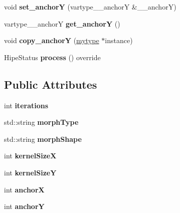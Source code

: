 \begin{DoxyCompactItemize}
void {\bfseries set\+\_\+anchorY} (vartype\+\_\+\+\_\+anchorY \&\+\_\+\+\_\+anchorY)
\item 
\mbox{\label{classfilter_1_1algos_1_1_erode_a42a3c13177f3756c07291c1bae19f8a4}} 
vartype\+\_\+\+\_\+anchorY {\bfseries get\+\_\+anchorY} ()
\item 
\mbox{\label{classfilter_1_1algos_1_1_erode_a3650b5064832039e85049883df7ac4a9}} 
void {\bfseries copy\+\_\+anchorY} (\hyperlink{classfilter_1_1algos_1_1_erode}{mytype} $\ast$instance)
\item 
\mbox{\label{classfilter_1_1algos_1_1_erode_a3307e2b455b2dd757bb8afa08e1c5df3}} 
Hipe\+Status {\bfseries process} () override
\end{DoxyCompactItemize}
\subsection*{Public Attributes}
\begin{DoxyCompactItemize}
\item 
\mbox{\label{classfilter_1_1algos_1_1_erode_add7d75df990a81e384dc121aee66a1db}} 
int {\bfseries iterations}
\item 
\mbox{\label{classfilter_1_1algos_1_1_erode_a4ce0ba3028d392dc896150f5ae9c52c1}} 
std\+::string {\bfseries morph\+Type}
\item 
\mbox{\label{classfilter_1_1algos_1_1_erode_aa227fda26f1a3f22565503ac582ca64f}} 
std\+::string {\bfseries morph\+Shape}
\item 
\mbox{\label{classfilter_1_1algos_1_1_erode_a800d0e2bc5b0dd558c03b9439e001afa}} 
int {\bfseries kernel\+SizeX}
\item 
\mbox{\label{classfilter_1_1algos_1_1_erode_a819f77cefff6ced201dd9c9a665ee258}} 
int {\bfseries kernel\+SizeY}
\item 
\mbox{\label{classfilter_1_1algos_1_1_erode_a2172a64f28b2b13b2f0107cea026f03a}} 
int {\bfseries anchorX}
\item 
\mbox{\label{classfilter_1_1algos_1_1_erode_aa1bdedb47e13feae33fb36368949af29}} 
int {\bfseries anchorY}
\end{DoxyCompactItemize}
